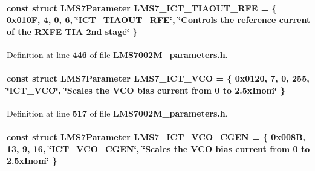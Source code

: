 \paragraph[{L\+M\+S7\+\_\+\+I\+C\+T\+\_\+\+T\+I\+A\+O\+U\+T\+\_\+\+R\+FE}]{\setlength{\rightskip}{0pt plus 5cm}const struct {\bf L\+M\+S7\+Parameter} L\+M\+S7\+\_\+\+I\+C\+T\+\_\+\+T\+I\+A\+O\+U\+T\+\_\+\+R\+FE = \{ 0x010\+F, 4, 0, 6, \char`\"{}\+I\+C\+T\+\_\+\+T\+I\+A\+O\+U\+T\+\_\+\+R\+F\+E\char`\"{}, \char`\"{}\+Controls the reference current of the R\+X\+F\+E T\+I\+A 2nd stage\char`\"{} \}\hspace{0.3cm}{\ttfamily [static]}}\label{LMS7002M__parameters_8h_a2db1afc0a41d305dd252325e1f37b21f}


Definition at line {\bf 446} of file {\bf L\+M\+S7002\+M\+\_\+parameters.\+h}.

\paragraph[{L\+M\+S7\+\_\+\+I\+C\+T\+\_\+\+V\+CO}]{\setlength{\rightskip}{0pt plus 5cm}const struct {\bf L\+M\+S7\+Parameter} L\+M\+S7\+\_\+\+I\+C\+T\+\_\+\+V\+CO = \{ 0x0120, 7, 0, 255, \char`\"{}\+I\+C\+T\+\_\+\+V\+C\+O\char`\"{}, \char`\"{}\+Scales the V\+C\+O bias current from 0 to 2.\+5x\+Inom\char`\"{} \}\hspace{0.3cm}{\ttfamily [static]}}\label{LMS7002M__parameters_8h_ade038fd538363a3b332b17205f53b6e4}


Definition at line {\bf 517} of file {\bf L\+M\+S7002\+M\+\_\+parameters.\+h}.

\paragraph[{L\+M\+S7\+\_\+\+I\+C\+T\+\_\+\+V\+C\+O\+\_\+\+C\+G\+EN}]{\setlength{\rightskip}{0pt plus 5cm}const struct {\bf L\+M\+S7\+Parameter} L\+M\+S7\+\_\+\+I\+C\+T\+\_\+\+V\+C\+O\+\_\+\+C\+G\+EN = \{ 0x008\+B, 13, 9, 16, \char`\"{}\+I\+C\+T\+\_\+\+V\+C\+O\+\_\+\+C\+G\+E\+N\char`\"{}, \char`\"{}\+Scales the V\+C\+O bias current from 0 to 2.\+5x\+Inom\char`\"{} \}\hspace{0.3cm}{\ttfamily [static]}}\label{LMS7002M__parameters_8h_a50cbc2822decdb9aacde5f0977dc1a94}


